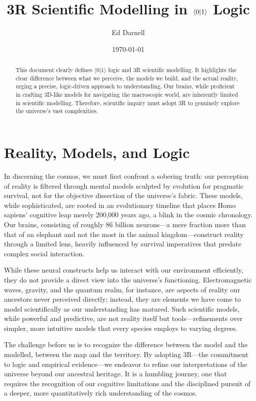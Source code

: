 \documentclass[12pt]{article}
\title{3R Scientific Modelling in \(\qbit\) Logic}
\author{Ed Darnell}
\date{\today}
\newcommand{\qbit}{\langle 0 | 1 \rangle}
\begin{document}
\begin{abstract}
  This document clearly defines \(\qbit\) logic and 3R scientific modelling. It highlights the clear difference between what we perceive, the models we build, and the actual reality, urging a precise, logic-driven approach to understanding. Our brains, while proficient in crafting 3D-like models for navigating the macroscopic world, are inherently limited in scientific modelling. Therefore, scientific inquiry must adopt 3R to genuinely explore the universe's vast complexities.
\end{abstract}
\section*{Reality, Models, and Logic}
In discerning the cosmos, we must first confront a sobering truth: our perception of reality is filtered through mental models sculpted by evolution for pragmatic survival, not for the objective dissection of the universe's fabric. These models, while sophisticated, are rooted in an evolutionary timeline that places Homo sapiens' cognitive leap merely 200,000 years ago, a blink in the cosmic chronology. Our brains, consisting of roughly 86 billion neurons—a mere fraction more than that of an elephant and not the most in the animal kingdom—construct reality through a limited lens, heavily influenced by survival imperatives that predate complex social interaction.

While these neural constructs help us interact with our environment efficiently, they do not provide a direct view into the universe's functioning. Electromagnetic waves, gravity, and the quantum realm, for instance, are aspects of reality our ancestors never perceived directly; instead, they are elements we have come to model scientifically as our understanding has matured. Such scientific models, while powerful and predictive, are not reality itself but tools—refinements over simpler, more intuitive models that every species employs to varying degrees.

The challenge before us is to recognize the difference between the model and the modelled, between the map and the territory. By adopting 3R—the commitment to logic and empirical evidence—we endeavor to refine our interpretations of the universe beyond our ancestral heritage. It is a humbling journey, one that requires the recognition of our cognitive limitations and the disciplined pursuit of a deeper, more quantitatively rich understanding of the cosmos.
\end{document}
